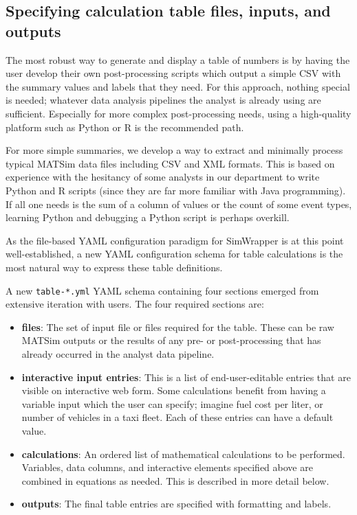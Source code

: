\hypertarget{calculation-tables-definition}{%
\subsection{Specifying calculation table files, inputs, and outputs }\label{calculation-tables-definition}}

The most robust way to generate and display a table of numbers is by having the user develop their own post-processing scripts which output a simple CSV with the summary values and labels that they need. For this approach, nothing special is needed; whatever data analysis pipelines the analyst is already using are sufficient. Especially for more complex post-processing needs, using a high-quality platform such as Python or R is the recommended path.

For more simple summaries, we develop a way to extract and minimally process typical MATSim data files including CSV and XML formats. This is based on experience with the hesitancy of some analysts in our department to write Python and R scripts (since they are far more familiar with Java programming). If all one needs is the sum of a column of values or the count of some event types, learning Python and debugging a Python script is perhaps overkill.

As the file-based YAML configuration paradigm for SimWrapper is at this point well-established, a new YAML configuration schema for table calculations is the most natural way to express these table definitions.

A new \texttt{table-*.yml} YAML schema containing four sections emerged from extensive iteration with users. The four required sections are:

\begin{itemize}

  \item \textbf{files}: The set of input file or files required for the table. These can be raw MATSim outputs or the results of any pre- or post-processing that has already occurred in the analyst data pipeline.

  \item \textbf{interactive input entries}: This is a list of end-user-editable entries that are visible on interactive web form. Some calculations benefit from having a variable input which the user can specify; imagine fuel cost per liter, or number of vehicles in a taxi fleet. Each of these entries can have a default value.

  \item \textbf{calculations}: An ordered list of mathematical calculations to be performed. Variables, data columns, and interactive elements specified above are combined in equations as needed. This is described in more detail below.

  \item \textbf{outputs}: The final table entries are specified with formatting and labels.

\end{itemize}

